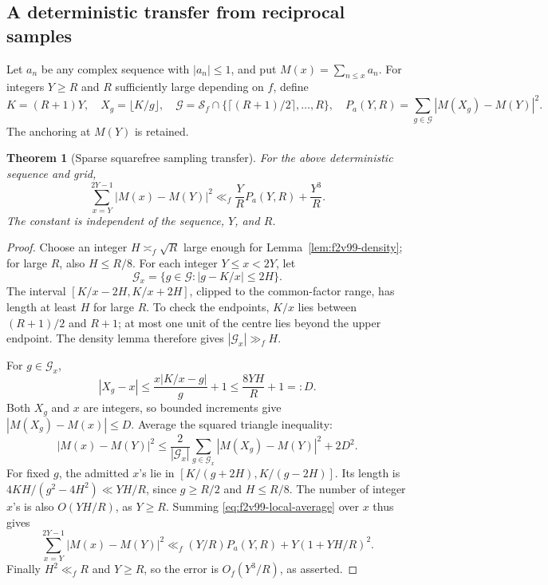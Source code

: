 \documentclass[11pt]{article}
\newtheorem{theorem}{Theorem}[section]
\theoremstyle{definition}
\theoremstyle{remark}
\begin{document}
\subsection{A deterministic transfer from reciprocal samples}

Let \(a_n\) be any complex sequence with \(|a_n|\le1\), and put
\(M(x)=\sum_{n\le x}a_n\).  For integers \(Y\ge R\) and
\(R\) sufficiently large depending on \(f\), define
\begin{equation}
 K=(R+1)Y,\quad X_g=\lfloor K/g\rfloor,\quad
 \mathcal G=\mathcal S_f\cap
       \{\lceil(R+1)/2\rceil,\ldots,R\},
 \quad
 P_a(Y,R)=\sum_{g\in\mathcal G}|M(X_g)-M(Y)|^2.
 \label{eq:f2v99-samples}
\end{equation}
The anchoring at \(M(Y)\) is retained.

\begin{theorem}[Sparse squarefree sampling transfer]
\label{thm:f2v99-sampling}
For the above deterministic sequence and grid,
\begin{equation}
 \sum_{x=Y}^{2Y-1}|M(x)-M(Y)|^2
 \ll_f \frac YR P_a(Y,R)+\frac{Y^3}{R}.
 \label{eq:f2v99-transfer}
\end{equation}
The constant is independent of the sequence, \(Y\), and \(R\).
\end{theorem}

\begin{proof}
Choose an integer \(H\asymp_f\sqrt R\) large enough for
Lemma~\ref{lem:f2v99-density}; for large \(R\), also \(H\le R/8\).
For each integer \(Y\le x<2Y\), let
\[
 \mathcal G_x=\{g\in\mathcal G:|g-K/x|\le2H\}.
\]
The interval \([K/x-2H,K/x+2H]\), clipped to the common-factor
range, has length at least \(H\) for large \(R\).  To check the
endpoints, \(K/x\) lies between \((R+1)/2\) and \(R+1\);
at most one unit of the centre lies beyond the upper endpoint.
The density lemma therefore gives \(|\mathcal G_x|\gg_f H\).

For \(g\in\mathcal G_x\),
\[
 |X_g-x|\le\frac{x|K/x-g|}{g}+1
             \le\frac{8YH}{R}+1=:D.
\]
Both \(X_g\) and \(x\) are integers, so bounded increments give
\(|M(X_g)-M(x)|\le D\).  Average the squared triangle inequality:
\begin{equation}
 |M(x)-M(Y)|^2
 \le\frac2{|\mathcal G_x|}\sum_{g\in\mathcal G_x}
                |M(X_g)-M(Y)|^2+2D^2.
 \label{eq:f2v99-local-average}
\end{equation}
For fixed \(g\), the admitted \(x\)'s lie in
\([K/(g+2H),K/(g-2H)]\).  Its length is
\(4KH/(g^2-4H^2)\ll YH/R\), since \(g\ge R/2\) and
\(H\le R/8\).  The number of integer \(x\)'s is also
\(O(YH/R)\), as \(Y\ge R\).  Summing
\eqref{eq:f2v99-local-average} over \(x\) thus gives
\[
 \sum_{x=Y}^{2Y-1}|M(x)-M(Y)|^2
 \ll_f (Y/R)P_a(Y,R)+Y(1+YH/R)^2.
\]
Finally \(H^2\ll_f R\) and \(Y\ge R\), so the error is
\(O_f(Y^3/R)\), as asserted.
\end{proof}
\end{document}
